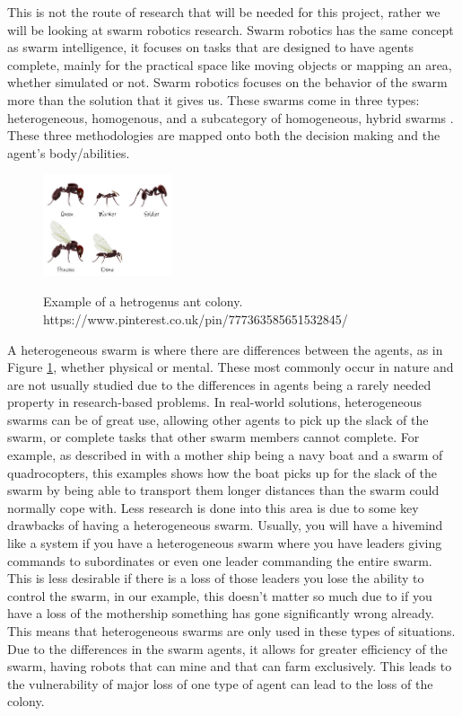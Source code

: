 \documentclass{UoYCSproject}
\begin{document}
This is not the route of research that will be needed for this project, rather we will be looking at swarm robotics research.
Swarm robotics has the same concept as swarm intelligence, it focuses on tasks that are designed to have agents complete, mainly for the practical space like moving objects or mapping an area, whether simulated or not.
Swarm robotics focuses on the behavior of the swarm more than the solution that it gives us.
These swarms come in three types: heterogeneous, homogenous, and a subcategory of homogeneous, hybrid swarms \cite{Swarm robotics reviewed}.
These three methodologies are mapped onto both the decision making and the agent's body/abilities.

\begin{figure}[htb]
\begin{center}
\label{fig:htb}
\includegraphics[height=3cm]{"./AntHetro.png"}
\end{center}
\caption{Example of a hetrogenus ant colony. https://www.pinterest.co.uk/pin/777363585651532845/}
\end{figure}

A heterogeneous swarm is where there are differences between the agents, as in Figure \ref{fig:htb}, whether physical or mental. These most commonly occur in nature and are not usually studied due to the differences in agents being a rarely needed property in research-based problems.
In real-world solutions, heterogeneous swarms can be of great use, allowing other agents to pick up the slack of the swarm, or complete tasks that other swarm members cannot complete. For example, as described in \cite{Swarm robotics reviewed} with a mother ship being a navy boat and a swarm of quadrocopters, this examples shows how the boat picks up for the slack of the swarm by being able to transport them longer distances than the swarm could normally cope with.
Less research is done into this area is due to some key drawbacks of having a heterogeneous swarm.
Usually, you will have a hivemind like a system if you have a heterogeneous swarm where you have leaders giving commands to subordinates or even one leader commanding the entire swarm.
This is less desirable if there is a loss of those leaders you lose the ability to control the swarm, in our example, this doesn't matter so much due to if you have a loss of the mothership something has gone significantly wrong already. This means that heterogeneous swarms are only used in these types of situations.
Due to the differences in the swarm agents, it allows for greater efficiency of the swarm, having robots that can mine and that can farm exclusively. This leads to the vulnerability of major loss of one type of agent can lead to the loss of the colony.
\end{document}
